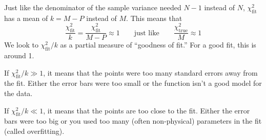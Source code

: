 \documentclass[12pt]{article}
\begin{document}
Just like the denominator of the sample variance needed $N-1$ instead of $N$, $\chi_\textrm{fit}^2$ has a mean of $k=M-P$ instead of $M$.  This means that
\[
\frac{\chi_\textrm{fit}^2}{k} = \frac{\chi_\textrm{fit}^2}{M-P} \approx 1
\qquad
\textrm{just like}  
\qquad
\frac{\chi_\textrm{true}^2}{M} \approx 1
\]
We look to $\chi_\textrm{fit}^2/k$ as a partial measure of ``goodness of fit.'' For a good fit, this is around 1.

If $\chi_\textrm{fit}^2/k \gg 1$, it means that the points were too many standard errors away from the fit. Either the error bars were too small or the function isn't a good model for the data.

If $\chi_\textrm{fit}^2/k \ll 1$, it means that the points are too close to the fit. Either the error bars were too big or you used too many (often non-physical) parameters in the fit (called overfitting).
\end{document}
